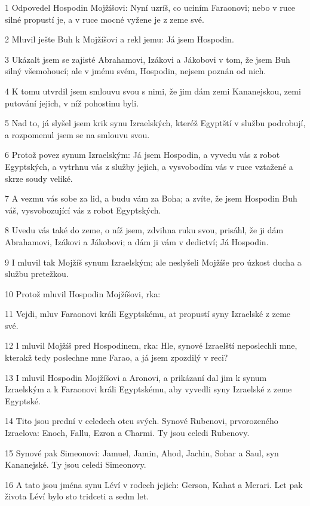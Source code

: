 \par 1 Odpovedel Hospodin Mojžíšovi: Nyní uzríš, co uciním Faraonovi; nebo v ruce silné propustí je, a v ruce mocné vyžene je z zeme své.
\par 2 Mluvil ješte Buh k Mojžíšovi a rekl jemu: Já jsem Hospodin.
\par 3 Ukázalt jsem se zajisté Abrahamovi, Izákovi a Jákobovi v tom, že jsem Buh silný všemohoucí; ale v jménu svém, Hospodin, nejsem poznán od nich.
\par 4 K tomu utvrdil jsem smlouvu svou s nimi, že jim dám zemi Kananejskou, zemi putování jejich, v níž pohostinu byli.
\par 5 Nad to, já slyšel jsem krik synu Izraelských, kteréž Egyptští v službu podrobují, a rozpomenul jsem se na smlouvu svou.
\par 6 Protož povez synum Izraelským: Já jsem Hospodin, a vyvedu vás z robot Egyptských, a vytrhnu vás z služby jejich, a vysvobodím vás v ruce vztažené a skrze soudy veliké.
\par 7 A vezmu vás sobe za lid, a budu vám za Boha; a zvíte, že jsem Hospodin Buh váš, vysvobozující vás z robot Egyptských.
\par 8 Uvedu vás také do zeme, o níž jsem, zdvihna ruku svou, prisáhl, že ji dám Abrahamovi, Izákovi a Jákobovi; a dám ji vám v dedictví; Já Hospodin.
\par 9 I mluvil tak Mojžíš synum Izraelským; ale neslyšeli Mojžíše pro úzkost ducha a službu pretežkou.
\par 10 Protož mluvil Hospodin Mojžíšovi, rka:
\par 11 Vejdi, mluv Faraonovi králi Egyptskému, at propustí syny Izraelské z zeme své.
\par 12 I mluvil Mojžíš pred Hospodinem, rka: Hle, synové Izraelští neposlechli mne, kterakž tedy poslechne mne Farao, a já jsem zpozdilý v reci?
\par 13 I mluvil Hospodin Mojžíšovi a Aronovi, a prikázaní dal jim k synum Izraelským a k Faraonovi králi Egyptskému, aby vyvedli syny Izraelské z zeme Egyptské.
\par 14 Tito jsou prední v celedech otcu svých. Synové Rubenovi, prvorozeného Izraelova: Enoch, Fallu, Ezron a Charmi. Ty jsou celedi Rubenovy.
\par 15 Synové pak Simeonovi: Jamuel, Jamin, Ahod, Jachin, Sohar a Saul, syn Kananejské. Ty jsou celedi Simeonovy.
\par 16 A tato jsou jména synu Léví v rodech jejich: Gerson, Kahat a Merari. Let pak života Léví bylo sto tridceti a sedm let.
